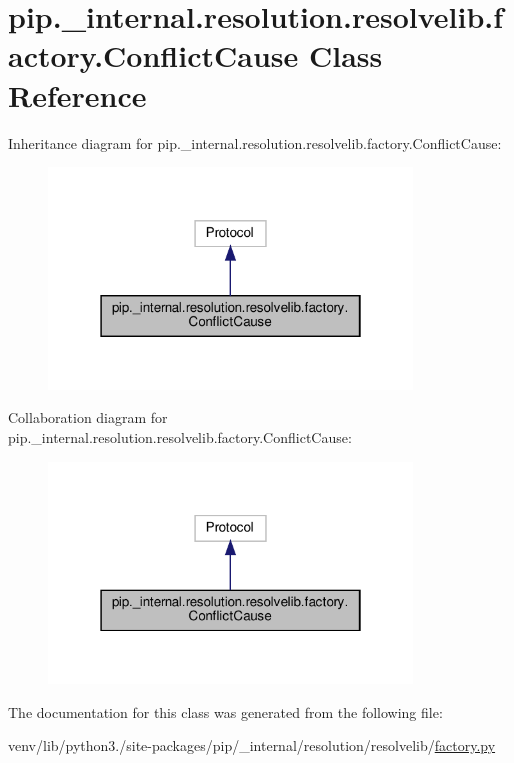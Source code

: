 \hypertarget{classpip_1_1__internal_1_1resolution_1_1resolvelib_1_1factory_1_1ConflictCause}{}\section{pip.\+\_\+internal.\+resolution.\+resolvelib.\+factory.\+Conflict\+Cause Class Reference}
\label{classpip_1_1__internal_1_1resolution_1_1resolvelib_1_1factory_1_1ConflictCause}


Inheritance diagram for pip.\+\_\+internal.\+resolution.\+resolvelib.\+factory.\+Conflict\+Cause\+:
\nopagebreak
\begin{figure}[H]
\begin{center}
\leavevmode
\includegraphics[width=274pt]{classpip_1_1__internal_1_1resolution_1_1resolvelib_1_1factory_1_1ConflictCause__inherit__graph}
\end{center}
\end{figure}


Collaboration diagram for pip.\+\_\+internal.\+resolution.\+resolvelib.\+factory.\+Conflict\+Cause\+:
\nopagebreak
\begin{figure}[H]
\begin{center}
\leavevmode
\includegraphics[width=274pt]{classpip_1_1__internal_1_1resolution_1_1resolvelib_1_1factory_1_1ConflictCause__coll__graph}
\end{center}
\end{figure}


The documentation for this class was generated from the following file\+:\begin{DoxyCompactItemize}
\item 
venv/lib/python3./site-\/packages/pip/\+\_\+internal/resolution/resolvelib/\hyperlink{factory_8py}{factory.\+py}\end{DoxyCompactItemize}

